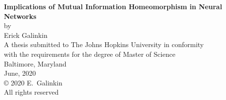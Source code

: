 \thispagestyle{empty}
\baselineskip=18pt
\begin{center}
\vspace*{3\baselineskip}
%
{\bfseries Implications of Mutual Information Homeomorphism in Neural Networks}\\[6\baselineskip]
%
by\\
%
Erick Galinkin\\[3\baselineskip]
%
%
A thesis submitted to The Johns Hopkins University in conformity\\
with the requirements for the degree of Master of Science\\[4\baselineskip]
%
Baltimore, Maryland\\
June, 2020\\[6\baselineskip]
%
{\copyright{} 2020 E.~Galinkin\\
All rights reserved}
%
\end{center}
%
\baselineskip=24pt
\newpage 
